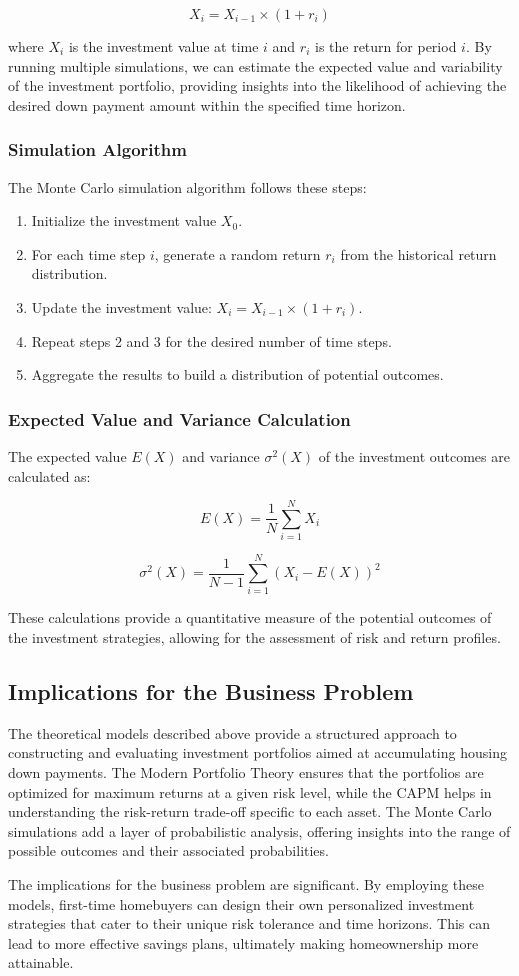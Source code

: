 \[
X_i = X_{i-1} \times (1 + r_i)
\]

where \( X_i \) is the investment value at time \( i \) and \( r_i \) is the return for period \( i \). By running multiple simulations, we can estimate the expected value and variability of the investment portfolio, providing insights into the likelihood of achieving the desired down payment amount within the specified time horizon.

\subsubsection{Simulation Algorithm}
The Monte Carlo simulation algorithm follows these steps:
\begin{enumerate}
    \item Initialize the investment value \( X_0 \).
    \item For each time step \( i \), generate a random return \( r_i \) from the historical return distribution.
    \item Update the investment value: \( X_i = X_{i-1} \times (1 + r_i) \).
    \item Repeat steps 2 and 3 for the desired number of time steps.
    \item Aggregate the results to build a distribution of potential outcomes.
\end{enumerate}

\subsubsection{Expected Value and Variance Calculation}
The expected value \( E(X) \) and variance \( \sigma^2(X) \) of the investment outcomes are calculated as:

\[
E(X) = \frac{1}{N} \sum_{i=1}^{N} X_i
\]

\[
\sigma^2(X) = \frac{1}{N - 1} \sum_{i=1}^{N} (X_i - E(X))^2
\]

These calculations provide a quantitative measure of the potential outcomes of the investment strategies, allowing for the assessment of risk and return profiles.

\subsection{Implications for the Business Problem}
The theoretical models described above provide a structured approach to constructing and evaluating investment portfolios aimed at accumulating housing down payments. The Modern Portfolio Theory ensures that the portfolios are optimized for maximum returns at a given risk level, while the CAPM helps in understanding the risk-return trade-off specific to each asset. The Monte Carlo simulations add a layer of probabilistic analysis, offering insights into the range of possible outcomes and their associated probabilities.

The implications for the business problem are significant. By employing these models, first-time homebuyers can design their own personalized investment strategies that cater to their unique risk tolerance and time horizons. This can lead to more effective savings plans, ultimately making homeownership more attainable.

